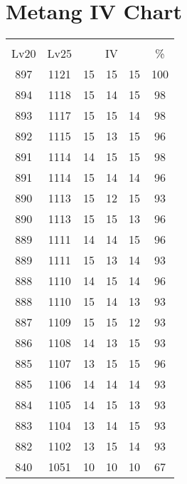 \documentclass{article}%
\begin{document}
%
\normalsize%
\section{Metang IV Chart}%
\label{sec:Metang IV Chart}%
\renewcommand{\arraystretch}{1.5}%
\begin{tabular}{|c|c|c|c|c|c|}%
\hline%
\multicolumn{6}{|c|}{\textcolor{white}{ 
\linebreak{Metang}
}%
\cellcolor{black}}\\%
\multicolumn{1}{|c}{Lv20}&\multicolumn{1}{c|}{Lv25}&\multicolumn{3}{c|}{IV}&\multicolumn{1}{|c|}{\%}\\%
\hline%
\rowcolor{color100}%
897&1121&15&15&15&100\\%
\hline%
\rowcolor{color98}%
894&1118&15&14&15&98\\%
\hline%
\rowcolor{color98}%
893&1117&15&15&14&98\\%
\hline%
\rowcolor{color96}%
892&1115&15&13&15&96\\%
\hline%
\rowcolor{color98}%
891&1114&14&15&15&98\\%
\hline%
\rowcolor{color96}%
891&1114&15&14&14&96\\%
\hline%
\rowcolor{color93}%
890&1113&15&12&15&93\\%
\hline%
\rowcolor{color96}%
890&1113&15&15&13&96\\%
\hline%
\rowcolor{color96}%
889&1111&14&14&15&96\\%
\hline%
\rowcolor{color93}%
889&1111&15&13&14&93\\%
\hline%
\rowcolor{color96}%
888&1110&14&15&14&96\\%
\hline%
\rowcolor{color93}%
888&1110&15&14&13&93\\%
\hline%
\rowcolor{color93}%
887&1109&15&15&12&93\\%
\hline%
\rowcolor{color93}%
886&1108&14&13&15&93\\%
\hline%
\rowcolor{color96}%
885&1107&13&15&15&96\\%
\hline%
\rowcolor{color93}%
885&1106&14&14&14&93\\%
\hline%
\rowcolor{color93}%
884&1105&14&15&13&93\\%
\hline%
\rowcolor{color93}%
883&1104&13&14&15&93\\%
\hline%
\rowcolor{color93}%
882&1102&13&15&14&93\\%
\hline%
\rowcolor{color91}%
840&1051&10&10&10&67\\%
\end{tabular}

%
\end{document}
